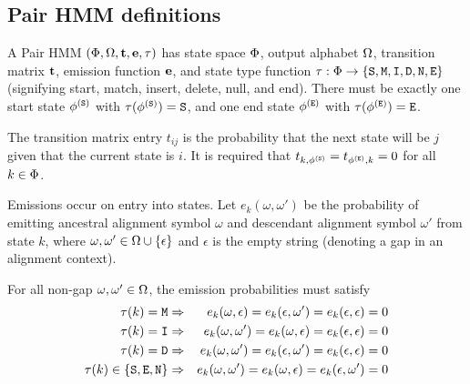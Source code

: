 \documentclass{article}
\newcommand\seclabel[1]{\label{sec:#1}}
\begin{document}
\newcommand\seqx{X}
\newcommand\seqy{Y}
\newcommand\len{L}

\newcommand\toLower{\mbox{toLowerCase}}

\newcommand\restorestates{{\tt RestoreStates}}
\newcommand\eliminatestates{{\tt EliminateStates}}
\newcommand\forwardmatrix{{\tt ForwardMatrix}}
\newcommand\forwardlikelihood{{\tt ForwardLikelihood}}
\newcommand\forwardtraceback{{\tt ForwardTraceback}}
\newcommand\sampleintermediates{{\tt SampleIntermediates}}

\newcommand\pop{{\tt pop}}

\subsection{Pair HMM definitions}
\seclabel{PairHMMdefs}

A Pair HMM $(\Phi,\Omega,{\bf t},{\bf e},\tau)$ has state space $\Phi$,
output alphabet $\Omega$,
transition matrix ${\bf t}$, emission function ${\bf e}$,
and state type function $\tau:\Phi \to \{ {\tt S}, {\tt M}, {\tt I}, {\tt D}, {\tt N}, {\tt E} \}$
(signifying start, match, insert, delete, null, and end).
There must be exactly one start state $\phi^{({\tt S})}$ with $\tau(\phi^{({\tt S})})={\tt S}$,
and one end state $\phi^{({\tt E})}$ with $\tau(\phi^{({\tt E})})={\tt E}$.

The transition matrix entry $t_{ij}$ is the probability that the next
state will be $j$ given that the current state is $i$.
It is required that $t_{k,\phi^{({\tt S})}}=t_{\phi^{({\tt E})},k}=0$ for all $k \in \Phi$.

Emissions occur on entry into states.
Let $e_k(\omega,\omega')$ be the probability of emitting ancestral alignment symbol $\omega$
and descendant alignment symbol $\omega'$ from state $k$,
where $\omega,\omega' \in \Omega \cup \{ \epsilon \}$ and $\epsilon$ is the empty string
(denoting a gap in an alignment context).

For all non-gap $\omega,\omega' \in \Omega$, the emission probabilities must satisfy
\begin{eqnarray*}
    \tau(k) = {\tt M} & \Rightarrow & e_k(\omega,\epsilon) = e_k(\epsilon,\omega') = e_k(\epsilon,\epsilon) = 0 \\
    \tau(k) = {\tt I} & \Rightarrow & e_k(\omega,\omega') = e_k(\omega,\epsilon) = e_k(\epsilon,\epsilon) = 0 \\
    \tau(k) = {\tt D} & \Rightarrow & e_k(\omega,\omega') = e_k(\epsilon,\omega') = e_k(\epsilon,\epsilon) = 0 \\
    \tau(k) \in \{ {\tt S}, {\tt E}, {\tt N} \} & \Rightarrow & e_k(\omega,\omega') = e_k(\omega,\epsilon) = e_k(\epsilon,\omega') = 0
\end{eqnarray*}
\end{document}
